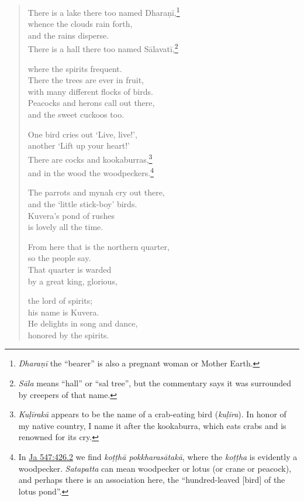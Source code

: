 \documentclass[12pt,openany]{book}%
\begin{document}
\begin{verse}
There is a lake there too named \textsanskrit{Dharaṇī},\footnote{\textit{\textsanskrit{Dharaṇī}} the “bearer” is also a pregnant woman or Mother Earth. } \\
whence the clouds rain forth, \\
and the rains disperse. \\
There is a hall there too named \textsanskrit{Sālavatī},\footnote{\textit{\textsanskrit{Sāla}} means “hall” or “sal tree”, but the commentary says it was surrounded by creepers of that name. } 

where the spirits frequent. \\
There the trees are ever in fruit, \\
with many different flocks of birds. \\
Peacocks and herons call out there, \\
and the sweet cuckoos too. 

One bird cries out ‘Live, live!’, \\
another ‘Lift up your heart!’ \\
There are cocks and kookaburras,\footnote{\textit{\textsanskrit{Kuḷīrakā}} appears to be the name of a crab-eating bird (\textit{\textsanskrit{kuḷīra}}). In honor of my native country, I name it after the kookaburra, which eats crabs and is renowned for its cry. } \\
and in the wood the woodpeckers.\footnote{In \href{https://suttacentral.net/ja547/en/sujato\#426.2}{Ja 547:426.2} we find \textit{\textsanskrit{koṭṭhā} \textsanskrit{pokkharasātakā}}, where the \textit{\textsanskrit{koṭṭha}} is evidently a woodpecker. \textit{Satapatta} can mean woodpecker or lotus (or crane or peacock), and perhaps there is an association here, the “hundred-leaved [bird] of the lotus pond”. } 

The parrots and mynah cry out there, \\
and the ‘little stick-boy’ birds. \\
Kuvera’s pond of rushes \\
is lovely all the time. 

From here that is the northern quarter, \\
so the people say. \\
That quarter is warded \\
by a great king, glorious, 

the lord of spirits; \\
his name is Kuvera. \\
He delights in song and dance, \\
honored by the spirits. 


\end{verse}
\end{document}
